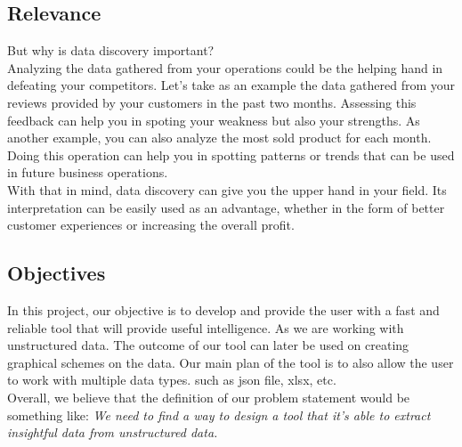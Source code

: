 \subsection{Relevance}
But why is data discovery important? 
\vspace{5mm} %
\\Analyzing the data gathered from your operations could be the helping hand in defeating your competitors. Let's take as an example the data gathered from your reviews provided by your customers in the past two months. Assessing this feedback can help you in spoting your weakness but also your strengths. As another example, you can also analyze the most sold product for each month. Doing this operation can help you in spotting patterns or trends that can be used in future business operations. 
\vspace{5mm} %
\\With that in mind, data discovery can give you the upper hand in your field. Its interpretation can be easily used as an advantage, whether in the form of better customer experiences or increasing the overall profit.

\subsection{Objectives}
In this project, our objective is to develop and provide the user with a fast and reliable tool that will provide useful intelligence. As we are working with unstructured data. The outcome of our tool can later be used on creating graphical schemes on the data. Our main plan of the tool is to also allow the user to work with multiple data types. such as json file, xlsx, etc.
\vspace{5mm} %
\\Overall, we believe that the definition of our problem statement would be something like: \textit{We need to find a way to design a tool that it's able to extract insightful data from unstructured data.}

